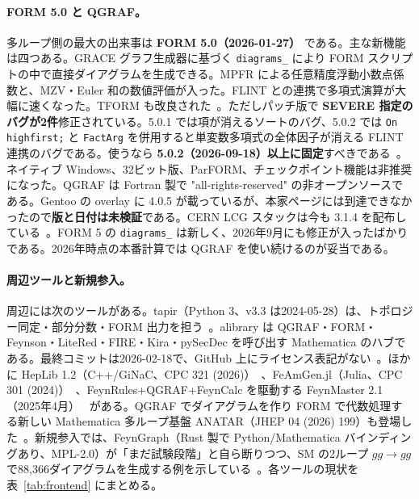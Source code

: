 \documentclass[a4paper,10pt]{ltjsarticle}
\begin{document}
\paragraph{FORM 5.0 と QGRAF。}多ループ側の最大の出来事は \textbf{FORM 5.0（2026-01-27）} である。主な新機能は四つある。GRACE グラフ生成器に基づく \texttt{diagrams\_} により FORM スクリプトの中で直接ダイアグラムを生成できる。MPFR による任意精度浮動小数点係数と、MZV・Euler 和の数値評価が入った。FLINT との連携で多項式演算が大幅に速くなった。TFORM も改良された~\cite{r16}。ただしパッチ版で \textbf{SEVERE 指定のバグが2件}修正されている。5.0.1 では項が消えるソートのバグ、5.0.2 では \texttt{On highfirst;} と \texttt{FactArg} を併用すると単変数多項式の全体因子が消える FLINT 連携のバグである。使うなら \textbf{5.0.2（2026-09-18）以上に固定}すべきである~\cite{r17,r18}。ネイティブ Windows、32ビット版、ParFORM、チェックポイント機能は非推奨になった。QGRAF は Fortran 製で "all-rights-reserved" の非オープンソースである。Gentoo の overlay に 4.0.5 が載っているが、本家ページには到達できなかったので\textbf{版と日付は未検証}である。CERN LCG スタックは今も 3.1.4 を配布している~\cite{r19,r20}。FORM 5 の \texttt{diagrams\_} は新しく、2026年9月にも修正が入ったばかりである。2026年時点の本番計算では QGRAF を使い続けるのが妥当である。

\paragraph{周辺ツールと新規参入。}周辺には次のツールがある。tapir（Python 3、v3.3 は2024-05-28）は、トポロジー同定・部分分数・FORM 出力を担う~\cite{r21,r22}。alibrary は QGRAF・FORM・Feynson・LiteRed・FIRE・Kira・pySecDec を呼び出す Mathematica のハブである。最終コミットは2026-02-18で、GitHub 上にライセンス表記がない~\cite{r23}。ほかに HepLib 1.2（C++/GiNaC、CPC 321 (2026)）~\cite{r24}、FeAmGen.jl（Julia、CPC 301 (2024)）~\cite{r25}、FeynRules+QGRAF+FeynCalc を駆動する FeynMaster 2.1（2025年4月）~\cite{r26} がある。QGRAF でダイアグラムを作り FORM で代数処理する新しい Mathematica 多ループ基盤 ANATAR（JHEP 04 (2026) 199）も登場した~\cite{r27}。新規参入では、FeynGraph（Rust 製で Python/Mathematica バインディングあり、MPL-2.0）が「まだ試験段階」と自ら断りつつ、SM の2ループ $gg\to gg$ で88,366ダイアグラムを生成する例を示している~\cite{r28}。各ツールの現状を表~\ref{tab:frontend} にまとめる。
\end{document}
